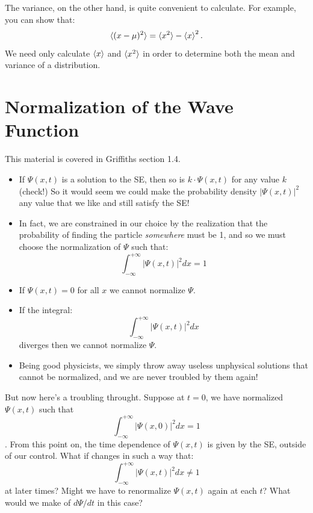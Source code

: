 \documentclass[12pt]{book}
\begin{document}
The variance, on the other hand, is quite convenient to calculate.
For example, you can show that:
\begin{equation}
\label{eqn:varhw}
\braket{(x-\mu)^2} = \braket{x^2} -\braket{x}^2.
\end{equation}
We need only calculate $\braket{x}$ and $\braket{x^2}$ in order
to determine both the mean and variance of a distribution.

\section{Normalization of the Wave Function}

This material is covered in Griffiths section 1.4.  
\begin{itemize}
 \item If $\Psi(x,t)$ is a solution to the SE, then so is $k \cdot \Psi(x,t)$ for any value $k$ (check!)  So it would seem we could make the probability density $|\Psi(x,t)|^2$ any value that we like and still satisfy the SE!  
 \item In fact, we are constrained in our choice by the realization that the probability of finding the particle {\em somewhere} must be 1, and so we must choose the normalization of $\Psi$ such that:
\begin{equation}
\label{eqn:norm}
\int_{-\infty}^{+\infty} |\Psi(x,t)|^2 dx = 1
\end{equation}

\item If $\Psi(x,t)=0$ for all $x$ we cannot normalize $\Psi$.
 \item If the integral:
$$\int_{-\infty}^{+\infty} |\Psi(x,t)|^2 dx$$
diverges then we cannot normalize $\Psi$.
\item Being good physicists, we simply throw away useless unphysical solutions that cannot be normalized, and we are never troubled by them again! 
\end{itemize}

But now here's a troubling throught.  Suppose at $t=0$, we have normalized $\Psi(x,t)$ such that
$$\int_{-\infty}^{+\infty} |\Psi(x,0)|^2 dx = 1$$.  
From this point on, the time dependence of $\Psi(x,t)$ is given by the SE, outside of our control.  What if changes in such a way that:
$$\int_{-\infty}^{+\infty} |\Psi(x,t)|^2 dx \neq 1$$ 
at later times?  Might we have to renormalize $\Psi(x,t)$ again at each $t$?  What would we make of $d\Psi/dt$ in this case?
\end{document}
